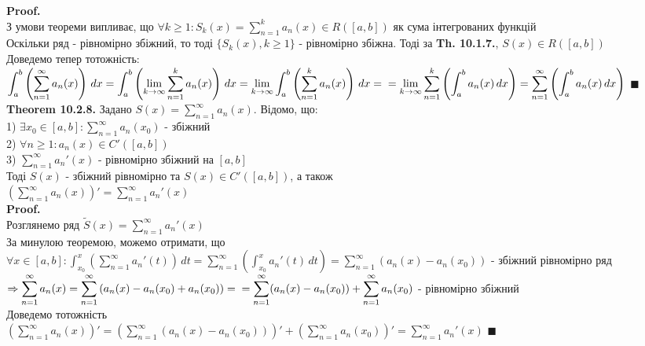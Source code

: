\documentclass[a4paper, 14pt]{extarticle}
\def\huge{\displaystyle}
\def\bigline{\vspace{5mm}\\}
\def\th#1{\textbf{Theorem {#1}}}
\def\proof{\textbf{Proof.}\\}
\def\bigline{\vspace{5mm}\\}
\def\qed{$\blacksquare$}
\begin{document}
\proof
З умови теореми випливає, що $\forall k \geq 1: S_k(x) = \huge \sum_{n=1}^k a_n(x) \in R([a,b])$ як сума інтегрованих функцій\\
Оскільки ряд - рівномірно збіжний, то тоді $\{S_k(x), k \geq 1\}$ - рівномірно збіжна. Тоді за \textbf{Th. 10.1.7.}, $S(x) \in R([a,b])$\\
Доведемо тепер тотожність:\\
$\huge \int_a^b \left( \sum_{n=1}^\infty a_n(x) \right) \,dx = \int_a^b \left( \lim_{k \to \infty} \sum_{n=1}^k a_n(x) \right) \,dx = \lim_{k \to \infty} \int_a^b \left( \sum_{n=1}^k a_n(x) \right) \,dx = \\ = \lim_{k \to \infty} \sum_{n=1}^k \left( \int_a^b a_n(x)\,dx \right) = \sum_{n=1}^\infty \left( \int_a^b a_n(x)\,dx \right)$ \qed
\bigline
\th{10.2.8.} Задано $S(x) = \huge \sum_{n=1}^\infty a_n(x)$. Відомо, що:\\
1) $\exists x_0 \in [a,b]: \huge \sum_{n=1}^\infty a_n(x_0)$ - збіжний\\
2) $\forall n \geq 1: a_n(x) \in C'([a,b])$\\
3) $\huge \sum_{n=1}^\infty a_n'(x)$ - рівномірно збіжний на $[a,b]$\\
Тоді $S(x)$ - збіжний рівномірно та $S(x) \in C'([a,b])$, а також\\
$\huge \left(  \sum_{n=1}^\infty a_n(x) \right)' = \sum_{n=1}^\infty a_n'(x)$\\
\proof
Розглянемо ряд $\tilde{S}(x) = \huge \sum_{n=1}^\infty a_n'(x)$\\
За минулою теоремою, можемо отримати, що\\
$\forall x \in [a,b]: \huge \int_{x_0}^x \left( \sum_{n=1}^\infty a_n'(t) \right) \,dt = \sum_{n=1}^\infty \left( \int_{x_0}^x a_n'(t) \,dt \right) = \sum_{n=1}^\infty \left( a_n(x) - a_n(x_0) \right)$ - збіжний рівномірно ряд\\
$\Rightarrow \huge \sum_{n=1}^\infty a_n(x) = \sum_{n=1}^\infty \left(a_n(x) - a_n(x_0) + a_n(x_0) \right) = \\ = \sum_{n=1}^\infty (a_n(x) - a_n(x_0)) + \sum_{n=1}^\infty a_n(x_0)$ - рівномірно збіжний\\
Доведемо тотожність\\
$ \huge \left( \sum_{n=1}^\infty a_n(x) \right)' = \left( \sum_{n=1}^\infty (a_n(x) - a_n(x_0)) \right)' + \left( \sum_{n=1}^\infty a_n(x_0) \right)' = \sum_{n=1}^\infty a_n'(x)$ \qed
\bigline
\end{document}
